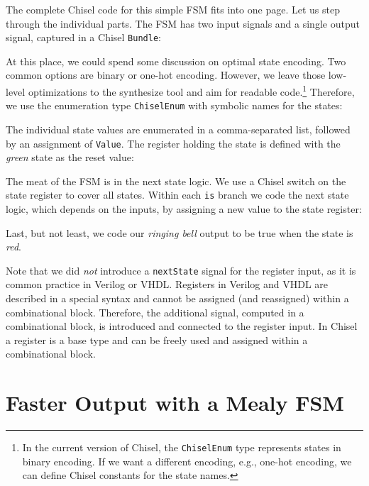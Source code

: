 \documentclass[%
    10pt,
    headinclude, footinclude=false,
    openright, %
    notitlepage,
    cleardoublepage=empty,
    headsepline,
    numbers=noenddot,
    bibliography=totoc, index=totoc,
    ]{scrbook}
\newcommand{\code}[1]{{\lstinline[basicstyle=\small\ttfamily]{#1}}}
\newcommand{\codefoot}[1]{{\lstinline[basicstyle=\footnotesize\ttfamily]{#1}}}
\begin{document}
The complete Chisel code for this simple FSM fits into one page.
Let us step through the individual parts.
The FSM has two input signals and a single output signal, captured in a Chisel \code{Bundle}:
%


\noindent At this place, we could spend some discussion on optimal state encoding. Two common options
are binary or one-hot encoding. However, we leave those low-level optimizations to
the synthesize tool and aim for readable code.\footnote{In the current version
of Chisel, the \codefoot{ChiselEnum} type represents states in binary encoding.
If we want a different encoding, e.g., one-hot encoding, we can define Chisel
constants for the state names.}
Therefore, we use the enumeration type \code{ChiselEnum} with symbolic names for the states:


\noindent The individual state values are enumerated in a comma-separated list,
followed by an assignment of \code{Value}.
The register holding the state is defined with the \emph{green} state as the reset value:


\noindent The meat of the FSM is in the next state logic. We use a Chisel switch on the
state register to cover all states. Within each \code{is} branch we code the next state
logic, which depends on the inputs, by assigning a new value to the state register:


\noindent Last, but not least, we code our \emph{ringing bell} output to be true when
the state is \emph{red}.


Note that we did \emph{not} introduce a \code{nextState} signal for the register input,
as it is common practice in Verilog or VHDL.
Registers in Verilog and VHDL are described in a special syntax and cannot
be assigned (and reassigned) within a combinational block.
Therefore, the additional signal, computed in a combinational block, is
introduced and connected to the register input.
In Chisel a register is a base type and can be freely used and assigned
within a combinational block.

\section{Faster Output with a Mealy FSM}
\end{document}

